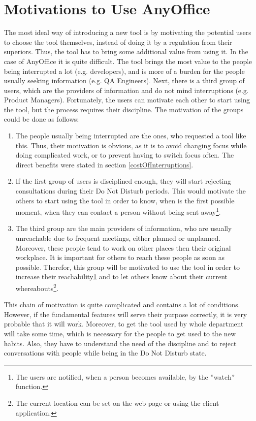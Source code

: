 \documentclass[11pt,singleside]{myfithesis2}
\begin{document}
	\section{Motivations to Use AnyOffice}
The most ideal way of introducing a new tool is by motivating the potential users to choose the tool themselves, instead of doing it by a regulation from their superiors. Thus, the tool has to bring some additional value from using it. In the case of AnyOffice it is quite difficult. The tool brings the most value to the people being interrupted a lot (e.g. developers), and is more of a burden for the people usually seeking information (e.g. QA Engineers). Next, there is a third group of users, which are the providers of information and do not mind interruptions (e.g. Product Managers). Fortunately, the users can motivate each other to start using the tool, but the process requires their discipline. The motivation of the groups could be done as follows:
\begin{enumerate}
	\item The people usually being interrupted are the ones, who requested a tool like this. Thus, their motivation is obvious, as it is to avoid changing focus while doing complicated work, or to prevent having to switch focus often. The direct benefits were stated in section \ref{costOfInterruptions}.
	\item If the first group of users is disciplined enough, they will start rejecting consultations during their Do Not Disturb periods. This would motivate the others to start using the tool in order to know, when is the first possible moment, when they can contact a person without being sent away\footnote{\label{note1}The users are notified, when a person becomes available, by the ''watch'' function.}. 
	\item The third group are the main providers of information, who are usually unreachable due to frequent meetings, either planned or unplanned. Moreover, these people tend to work on other places then their original workplace. It is important for others to reach these people as soon as possible. Therefor, this group will be motivated to use the tool in order to increase their reachability\cref{note1} and to let others know about their current whereabouts\footnote{The current location can be set on the web page or using the client application.}.
\end{enumerate}

This chain of motivation is quite complicated and contains a lot of conditions. However, if the fundamental features will serve their purpose correctly, it is very probable that it will work. Moreover, to get the tool used by whole department will take some time, which is necessary for the people to get used to the new habits. Also, they have to understand the need of the discipline and to reject conversations with people while being in the Do Not Disturb state. 
\end{document}
